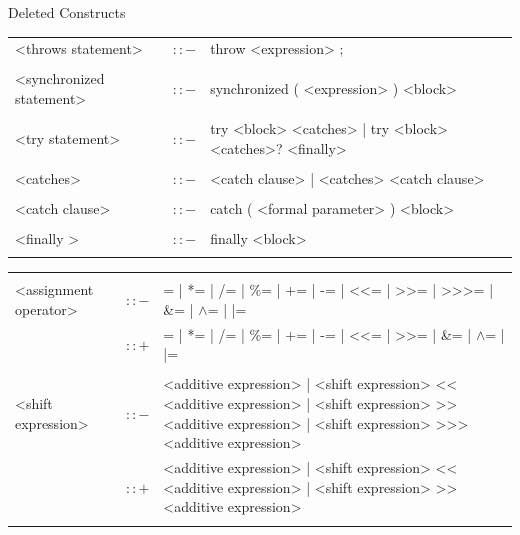 \documentclass[landscape, 11pt]{article}
\begin{document}
\begin{qsection}{Deleted Constructs}
\begin{enumerate}[label=\bt{\theenumi.}]
\begin{longtable}{R{7cm} c L{15cm}}
				<throws statement>							&	$\colon\colon-$	&	throw <expression> ; \\\\
				<synchronized statement>					&	$\colon\colon-$	&	synchronized ( <expression> ) <block> \\\\
				<try statement>								&	$\colon\colon-$	&	try <block> <catches> | try <block> <catches>? <finally> \\\\
				<catches>									&	$\colon\colon-$	&	<catch clause> | <catches> <catch clause> \\\\
				<catch clause>								&	$\colon\colon-$	&	catch ( <formal parameter> ) <block> \\\\
				<finally >									&	$\colon\colon-$	&	finally <block> \\\\
			\end{longtable}

		\ditem[Expressions.]

			\begin{longtable}{R{7cm} c L{15cm}}
													&					&	 \\
				<assignment operator>						&	$\colon\colon-$	&	= | *= | /= | \%= | += | -= | <<= | >>= | >>>= | \&= | $\wedge$= | |= \\
															&	$\colon\colon+$	&	= | *= | /= | \%= | += | -= | <<= | >>= | \&= | $\wedge$= | |= \\\\
				<shift expression>							&	$\colon\colon-$	&	<additive expression> | <shift expression> << <additive expression> | <shift expression> >> <additive expression> | <shift expression> >>> <additive expression> \\
															&	$\colon\colon+$	&	<additive expression> | <shift expression> << <additive expression> | <shift expression> >> <additive expression> \\\\
			\end{longtable}

		\ditem[Tokens.]


\end{enumerate}
\end{qsection}
\end{document}
